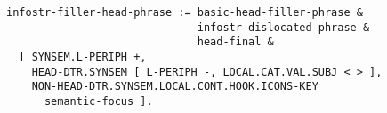 \documentclass[a4paper]{article}
\begin{document}
{\small\begin{verbatim}
infostr-filler-head-phrase := basic-head-filler-phrase & 
                              infostr-dislocated-phrase & 
                              head-final &
  [ SYNSEM.L-PERIPH +,
    HEAD-DTR.SYNSEM [ L-PERIPH -, LOCAL.CAT.VAL.SUBJ < > ],
    NON-HEAD-DTR.SYNSEM.LOCAL.CONT.HOOK.ICONS-KEY 
      semantic-focus ].
\end{verbatim}}
\end{document}
